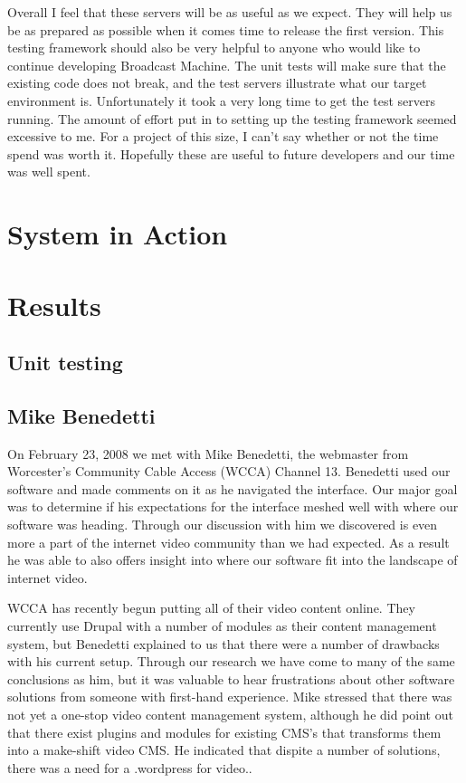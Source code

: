 \documentclass[a4paper,12pt]{report}
\begin{document}
Overall I feel that these servers will be as useful as we expect.
They will help us be as prepared as possible when it comes time to release the first version.
This testing framework should also be very helpful to anyone who would like to continue developing Broadcast Machine.
The unit tests will make sure that the existing code does not break, and the test servers illustrate what our target environment is.
Unfortunately it took a very long time to get the test servers running.
The amount of effort put in to setting up the testing framework seemed excessive to me.
For a project of this size, I can't say whether or not the time spend was worth it.
Hopefully these are useful to future developers and our time was well spent. 

\chapter{System in Action}

\chapter{Results}

\section{Unit testing}


\section{Mike Benedetti}

On February 23, 2008 we met with Mike Benedetti, the webmaster from Worcester's Community Cable Access (WCCA) Channel 
13. 
Benedetti used our software and made comments on it as he navigated the interface. 
Our major goal was to determine if his expectations for the interface meshed well with where our software was heading. 
Through our discussion with him we discovered is even more a part of the internet video community than we had expected. 
As a result he was able to also offers insight into where our software fit into the landscape of internet video.

WCCA has recently begun putting all of their video content online. 
They currently use Drupal with a number of modules as their content management system, but Benedetti explained to us 
that there were a number of drawbacks with his current setup. 
Through our research we have come to many of the same conclusions as him, but it was valuable to hear frustrations about 
other software solutions from someone with first-hand experience. 
Mike stressed that there was not yet a one-stop video content management system, although he did point out that there 
exist plugins and modules for existing CMS's that transforms them into a make-shift video CMS. 
He indicated that dispite a number of solutions, there was a need for a .wordpress for video..
\end{document}
